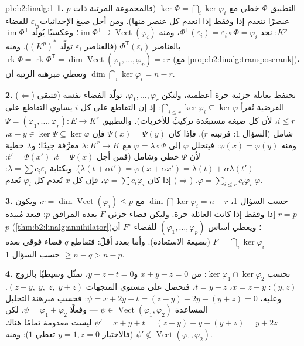 \begin{solution}{pb:b2:linalg:1}
\textbf{1.} التطبيق $\Phi$ خطي مع $\ker\Phi = \bigcap_i
\ker\varphi_i$ (فالمجموعة المرتبة ذات $p$ عنصرًا تنعدم إذا وفقط إذا انعدم كل عنصر منها). ومن أجل
صيغ الإحداثيات $\varepsilon_i$ للفضاء $K^p$: نجد $\Phi^{\mathsf
T}(\varepsilon_i) = \varepsilon_i \circ \Phi = \varphi_i$، ومنه
$\operatorname{im}\Phi^{\mathsf T} \supseteq
\operatorname{Vect}(\varphi_i)$؛ وعكسيًا
يُولَّد $\operatorname{im}\Phi^{\mathsf T}$ بالعناصر
$\Phi^{\mathsf T}(\varepsilon_i)$ (فالعناصر $\varepsilon_i$ تولّد
$(K^p)^*$). ومنه $\operatorname{rk}\Phi = \operatorname{rk}
\Phi^{\mathsf T} = \dim\operatorname{Vect}(\varphi_1, \dots,
\varphi_p) =: r$ (مع \cref{prop:b2:linalg:transposerank})، وتعطي
مبرهنة الرتبة أن $\dim\bigcap_i\ker\varphi_i = n - r$.

\textbf{2.} ($\Leftarrow$) نحتفظ بعائلة جزئية حرة أعظمية، ولتكن
$\varphi_1, \dots, \varphi_r$، تولّد الفضاء نفسه (فتبقى
الفرضية تُقرأ $\bigcap_{i \leq r}\ker\varphi_i \subseteq
\ker\varphi$: إذ إن التقاطع على كل $i$ يساوي التقاطع على
$i \leq r$، لأن كل صيغة مستبعَدة تركيبٌ للأخريات). والتطبيق
$\Psi = (\varphi_1, \dots, \varphi_r) \colon E \to K^r$
شامل (السؤال 1: فرتبته $r$). فإذا كان $\Psi(x) = \Psi(y)$
فإن $x - y \in \ker\Psi \subseteq \ker\varphi$، ومنه $\varphi(x) =
\varphi(y)$: فيتحلل $\varphi$ إلى $\varphi = \lambda \circ \Psi$
مع $\lambda \colon K^r \to K$ معرَّفة جيدًا؛ و$\lambda$ خطية
لأن $\Psi$ خطي وشامل (فمن أجل $t = \Psi(x)$، $t' =
\Psi(x')$: $\lambda(t + \alpha t') = \varphi(x + \alpha x') =
\lambda(t) + \alpha\lambda(t')$). وبكتابة $\lambda = \sum c_i
\varepsilon_i$: $\varphi = \sum_{i \leq r} c_i\varphi_i$.
($\Rightarrow$) إذا كان $\varphi = \sum c_i \varphi_i$، فإن كل $x$
تُعدم كل $\varphi_i$ تُعدم $\varphi$.

\textbf{3.} حسب السؤال 1، $\dim\bigcap\ker\varphi_i = n - r$
مع $r = \dim\operatorname{Vect}(\varphi_i) \leq p$، ويكون $r = p$
إذا وفقط إذا كانت العائلة حرة. وليكن فضاء جزئي $F$ بعده المرافق $p$: فبعد
مُبيده $p$
(\cref{thm:b2:linalg:annihilator})؛ ويعطي أساس $(\varphi_1, \dots,
\varphi_p)$ للفضاء $F^\circ$ أن $F = \bigcap_i\ker\varphi_i$ (بصيغة
الاستعادة). وأما بعدد أقلّ: فتقاطع $q$ فضاء فوقي بعده
$\geq n - q > n - p$ حسب السؤال 1.

\textbf{4.} نحسب $\ker\varphi_1 \cap \ker\varphi_2$: من $x
+ y - z = 0$ و$y + z - t = 0$، نمثّل وسيطيًا بالزوج $(y, z)$: $x = z
- y$، $t = y + z$، فنحصل على مستوي المتجهات $(z - y,\; y,\;
z,\; y + z)$. وعليه، $\psi = x + 2y - t = (z - y) + 2y - (y + z)
= 0$: فحسب مبرهنة التحليل المساعدة $\psi \in
\operatorname{Vect}(\varphi_1, \varphi_2)$ --- وفعلًا $\psi =
\varphi_1 + \varphi_2$. لكن $\psi' = x + y + t = (z - y) + y +
(y + z) = y + 2z$ ليست معدومة تمامًا هناك (فالاختيار $y = 1, z = 0$
تعطي $1$): ومنه $\psi' \notin \operatorname{Vect}(\varphi_1,
\varphi_2)$.


\end{solution}
